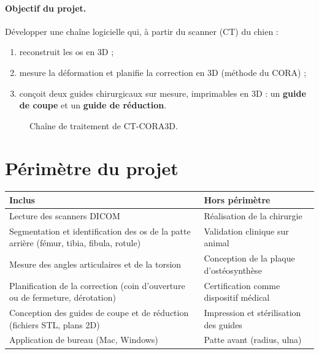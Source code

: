 \documentclass[11pt,a4paper]{article}
\begin{document}
\paragraph{Objectif du projet.} Développer une chaîne logicielle qui, à partir du scanner (CT) du chien :
\begin{enumerate}
  \item reconstruit les os en 3D ;
  \item mesure la déformation et planifie la correction en 3D (méthode du CORA) ;
  \item conçoit deux guides chirurgicaux sur mesure, imprimables en 3D : un \textbf{guide de coupe} et un
        \textbf{guide de réduction}.
\end{enumerate}

\begin{figure}[h]
  \centering
  \caption{Chaîne de traitement de CT-CORA3D.}
\end{figure}

\section{Périmètre du projet}

\begin{tabularx}{\textwidth}{@{}XX@{}}
\toprule
\textbf{Inclus} & \textbf{Hors périmètre} \\ \midrule
Lecture des scanners DICOM & Réalisation de la chirurgie \\
Segmentation et identification des os de la patte arrière (fémur, tibia, fibula, rotule) & Validation clinique sur animal \\
Mesure des angles articulaires et de la torsion & Conception de la plaque d'ostéosynthèse \\
Planification de la correction (coin d'ouverture ou de fermeture, dérotation) & Certification comme dispositif médical \\
Conception des guides de coupe et de réduction (fichiers STL, plans 2D) & Impression et stérilisation des guides \\
Application de bureau (Mac, Windows) & Patte avant (radius, ulna) \\ \bottomrule
\end{tabularx}
\end{document}
